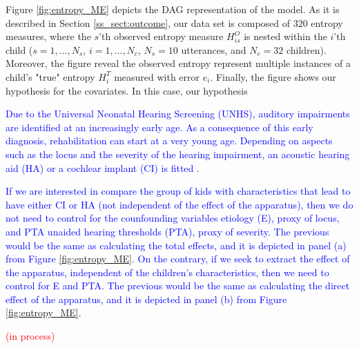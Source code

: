 Figure \ref{fig:entropy_ME} depicts the DAG representation of the model. As it is described in Section \ref{ss_sect:outcome}, our data set is composed of $320$ entropy measures, where the $s$'th observed entropy measure $H^{O}_{is}$ is nested within the $i$'th child ($s=1, \dots, N_{s}$, $i=1, \dots, N_{c}$, $N_{s} = 10$ utterances, and $N_{c} = 32$ children). Moreover, the figure reveal the observed entropy represent multiple instances of a child's "true" entropy $H^{T}_{i}$ measured with error $e_i$. Finally, the figure shows our hypothesis for the covariates. In this case, our hypothesis

\textcolor{blue}{Due to the Universal Neonatal Hearing Screening (UNHS), auditory impairments are identified at an increasingly early age. As a consequence of this early diagnosis, rehabilitation can start at a very young age. Depending on aspects such as the locus and the severity of the hearing impairment, an acoustic hearing aid (HA) or a cochlear implant (CI) is fitted \citep{Korver_et_al_2017}.}

\textcolor{blue}{If we are interested in compare the group of kids with characteristics that lead to have either CI or HA (not independent of the effect of the apparatus), then we do not need to control for the counfounding variables etiology (E), proxy of locus, and PTA unaided hearing thresholds (PTA), proxy of severity. The previous would be the same as calculating the total effects, and it is depicted in panel (a) from Figure \ref{fig:entropy_ME}. On the contrary, if we seek to extract the effect of the apparatus, independent of the children's characteristics, then we need to control for E and PTA. The previous would be the same as calculating the direct effect of the apparatus, and it is depicted in panel (b) from Figure \ref{fig:entropy_ME}.}


\textcolor{red}{(in process)} \\

\begin{comment}
	Identification of model:  
	soft identification (see \citet{Depaoli_2021}) 
	
	- Normal measurement error model: 
	entropy_j ~ N( entropy_true_j, sigma_e) 
	
	- In (Faes_et_al_2021) they use a random effects model for the entropy. 
	entropy_j = entropy_true_j + error 
	error ~ N( 0, sigma_e) 
	* Notice both are the same (priors for entropy_true_j are needed) 
	
	- Beta measurement error model: 
	entropy_j ~ beta(alpha, beta) 
	alpha = mu*M        ->  mu = alpha / M (mean) 
	beta = (1 - mu)*M  ->  M = alpha + beta (prior sample size) 
	* where mu = entropy_true_j and M is a distribution centered in 10 (utterances) 
\end{comment}
%
%
